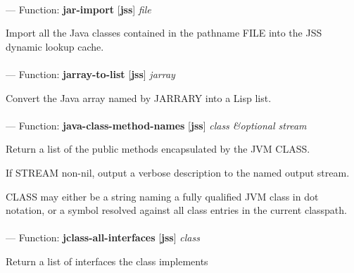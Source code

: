 \paragraph{}
\label{JSS:JAR-IMPORT}
--- Function: \textbf{jar-import} [\textbf{jss}] \textit{file}

\begin{adjustwidth}{5em}{5em}
Import all the Java classes contained in the pathname FILE into the JSS dynamic lookup cache.
\end{adjustwidth}

\paragraph{}
\label{JSS:JARRAY-TO-LIST}
--- Function: \textbf{jarray-to-list} [\textbf{jss}] \textit{jarray}

\begin{adjustwidth}{5em}{5em}
Convert the Java array named by JARRARY into a Lisp list.
\end{adjustwidth}

\paragraph{}
\label{JSS:JAVA-CLASS-METHOD-NAMES}
--- Function: \textbf{java-class-method-names} [\textbf{jss}] \textit{class \&optional stream}

\begin{adjustwidth}{5em}{5em}
Return a list of the public methods encapsulated by the JVM CLASS.

If STREAM non-nil, output a verbose description to the named output stream.

CLASS may either be a string naming a fully qualified JVM class in dot
notation, or a symbol resolved against all class entries in the
current classpath.
\end{adjustwidth}

\paragraph{}
\label{JSS:JCLASS-ALL-INTERFACES}
--- Function: \textbf{jclass-all-interfaces} [\textbf{jss}] \textit{class}

\begin{adjustwidth}{5em}{5em}
Return a list of interfaces the class implements
\end{adjustwidth}

